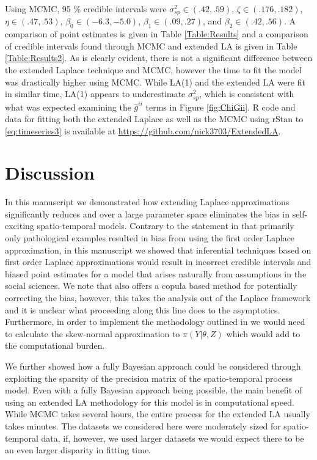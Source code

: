 \documentclass[11pt]{isuthesis}
\begin{document}
	Using MCMC, 95 \% credible intervals were $\sigma_{sp}^2 \in (.42,.59)$, $\zeta \in (.176,.182)$, $\eta \in (.47,.53)$, $\beta_0 \in (-6.3,-5.0)$, $\beta_1 \in (.09,.27)$, and $\beta_2 \in (.42,.56)$.  A comparison of point estimates is given in Table \ref{Table:Results} and a comparison of credible intervals found through MCMC and extended LA is given in Table \ref{Table:Results2}.  As is clearly evident, there is not a significant difference between the extended Laplace technique and MCMC, however the time to fit the model was drastically higher using MCMC.  While LA(1) and the extended LA were fit in similar time, LA(1) appears to underestimate $\sigma_{sp}^2$, which is consistent with what was expected examining the $\hat{g}^{ii}$ terms in Figure \ref{fig:ChiGii}.  R code and data for fitting both the extended Laplace as well as the MCMC using rStan to \ref{eq:timeseries3} is available at \href{https://github.com/nick3703/ExtendedLA}{https://github.com/nick3703/ExtendedLA}.

	\section{Discussion}
	In this manuscript we demonstrated how extending Laplace approximations significantly reduces and over a large parameter space eliminates the bias in self-exciting spatio-temporal models.  Contrary to the statement in \cite{rue2009approximate} that primarily only pathological examples resulted in bias from using the first order Laplace approximation, in this manuscript we showed that inferential techniques based on first order Laplace approximations would result in incorrect credible intervals and biased point estimates for  a model that arises naturally from assumptions in the social sciences.  We note that \cite{ferkingstad2015improving} also offers a copula based method for potentially correcting the bias, however, this takes the analysis out of the Laplace framework and it is unclear what proceeding along this line does to the asymptotics. Furthermore, in order to implement the methodology outlined in \cite{ferkingstad2015improving} we would need to calculate the skew-normal approximation to $\pi(Y|\theta,Z)$ which would add to the computational burden.
	
	We further showed how a fully Bayesian approach could be considered through exploiting the sparsity of the precision matrix of the spatio-temporal process model.  Even with a fully Bayesian approach being possible, the main benefit of using an extended LA methodology for this model is in computational speed.  While MCMC takes several hours, the entire process for the extended LA usually takes minutes.  The datasets we considered here were moderately sized for spatio-temporal data, if, however, we used larger datasets we would expect there to be an even larger disparity in fitting time.
	
\end{document}
